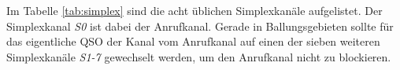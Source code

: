 Im Tabelle \ref{tab:simplex} sind die acht üblichen Simplexkanäle aufgelistet. Der Simplexkanal \emph{S0} ist dabei der Anrufkanal. Gerade in Ballungsgebieten sollte für das eigentliche QSO der Kanal vom Anrufkanal auf einen der sieben weiteren Simplexkanäle \emph{S1-7} gewechselt werden, um den Anrufkanal nicht zu blockieren. 